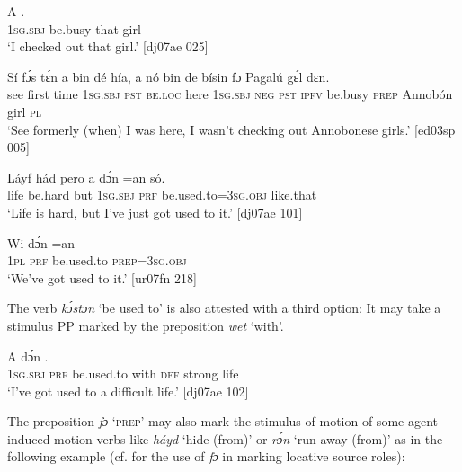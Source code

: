 \ea%
    \label{ex:key:1052}
    \gll A    .\\
\textsc{1sg.sbj}  be.busy  that    girl\\

\glt ‘I checked out that girl.’ [dj07ae 025]
\z


\ea%
    \label{ex:key:1053}
    \gll Sí  fɔ́s  tɛ́n    a    bin  dé    hía,    a    nó
bin  de  bísin  fɔ  Pagalú    gɛ́l  dɛn.\\
see  first  time    \textsc{1sg.sbj}  \textsc{pst}  \textsc{be.loc}  here    \textsc{1sg.sbj}  \textsc{neg}
\textsc{pst}  \textsc{ipfv}  be.busy  \textsc{prep}  Annobón    girl  \textsc{pl}\\

\glt ‘See formerly (when) I was here, I wasn’t checking out 
Annobonese girls.’ [ed03sp 005]
\z


\ea%
    \label{ex:key:1054}
    \gll Láyf    hád    pero  a    dɔ́n  =an    só.\\
life    be.hard  but    \textsc{1sg.sbj}  \textsc{prf}  be.used.to=\textsc{3sg.obj}  like.that\\

\glt ‘Life is hard, but I’ve just got used to it.’ [dj07ae 101]
\z


\ea%
    \label{ex:key:1055}
    \gll Wi  dɔ́n     =an\\
\textsc{1pl}  \textsc{prf}  be.used.to  \textsc{prep}=\textsc{3sg.obj}\\

\glt ‘We’ve got used to it.’ [ur07fn 218]
\z

The verb \textit{kɔ́stɔn} ‘be used to’ is also attested with a third option: It may take a stimulus PP marked by the preposition \textit{wet} ‘with’.


\ea%
    \label{ex:key:1056}
    \gll A    dɔ́n                .\\
\textsc{1sg.sbj}  \textsc{prf}  be.used.to  with    \textsc{def}  strong  life\\

\glt ‘I’ve got used to a difficult life.’ [dj07ae 102]
\z

The preposition \textit{fɔ} ‘\textsc{prep}’ may also mark the stimulus of motion\is{} of some agent-induced motion verbs like \textit{háyd} ‘hide (from)’ or \textit{rɔ́n} ‘run away (from)’ as in the following example (cf.  for the use of \textit{fɔ} in marking locative source\index{} roles): 


